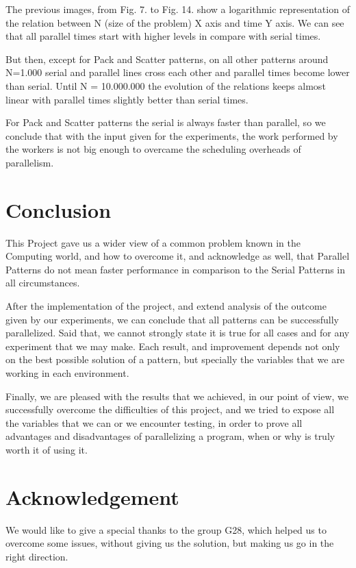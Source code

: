 \documentclass[10pt,journal,compsoc]{IEEEtran}
\begin{document}
The previous images, from Fig. 7. to Fig. 14. show a logarithmic representation of the relation between N (size of the problem) X axis and time Y axis. We can see that all parallel times start with higher levels in compare with serial times. 

But then, except for Pack and Scatter patterns, on all other patterns around N=1.000 serial and parallel lines cross each other and parallel times become lower than serial. Until N = 10.000.000 the evolution of the relations keeps almost linear with parallel times slightly better than serial times.

For Pack and Scatter patterns the serial is always faster than parallel, so we conclude that with the input given for the experiments,  the work performed by the workers is not big enough to overcame the scheduling overheads of parallelism.

\section{Conclusion}
This Project gave us a wider view of a common problem known in the Computing world, and how to overcome it, and acknowledge as well, that Parallel Patterns do not mean faster performance in comparison to the Serial Patterns in all circumstances.

After the implementation of the project, and extend analysis of the outcome given by our experiments, we can conclude that all patterns can be successfully parallelized. Said that, we cannot strongly state it is true for all cases and for any experiment that we may make. Each result, and improvement depends not only on the best possible solution of a pattern, but specially the variables that we are working in each environment.

Finally, we are pleased with the results that we achieved, in our point of view, we successfully overcome the difficulties of this project, and we tried to expose all the variables that we can or we encounter testing, in order to prove all advantages and disadvantages of parallelizing a program, when or why is truly worth it of using it.



\section*{Acknowledgement}

We would like to give a special thanks to the group G28,  which helped us to overcome some issues, without giving us the solution, but making us go in the right direction.
\end{document}

